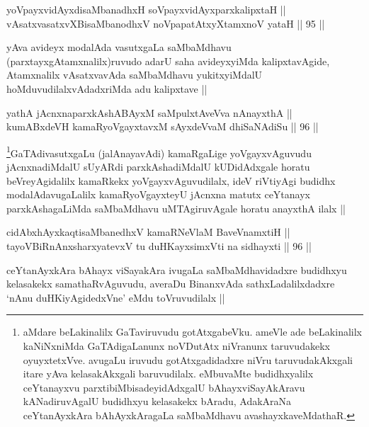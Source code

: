 \begin{shl}
yoV\s payxvidAyxdisaMbanadhxH soV\s payxvidAyxparxkalipxtaH ||  \\
vAsatxvasatxvXBisaMbanodhxV noVpapatAtxyX\s \s tamxnoV yataH ||  95 ||  
\end{shl}

\begin{artha}
yAva avideyx modalAda vasutxgaLa saMbaMdhavu (parxtayxgAtamxnalilx)ruvudo adarU saha avideyxyiMda kalipxtavAgide, Atamxnalilx vAsatxvavAda saMbaMdhavu yukitxyiMdalU hoMduvudilalxvAdadxriMda adu kalipxtave ||
\end{artha}


\begin{shl}
yathA jAcnxnaparxkAshABAyxM saMpulxtAveVva nAnayxthA || \\
kumABxdeVH kamaRyoVgayxtavxM sAyxdeVvaM dhiSaNAdiSu ||  96 || 
\end{shl}

\begin{artha}
\footnote{aMdare beLakinalilx GaTaviruvudu gotAtxgabeVku. ameVle ade beLakinalilx kaNiNxniMda GaTAdigaLanunx noVDutAtx niVranunx taruvudakekx oyuyxtetxVve. avugaLu iruvudu gotAtxgadidadxre niVru taruvudakAkxgali itare yAva kelasakAkxgali baruvudilalx. eMbuvaMte budidhxyalilx ceYtanayxvu parxtibiMbisadeyidAdxgalU bAhayxviSayAkAravu kANadiruvAgalU budidhxyu kelasakekx bAradu, AdakAraNa ceYtanAyxkAra bAhAyxkAragaLa saMbaMdhavu avashayxkaveMdathaR.}GaTAdivasutxgaLu (jalAnayavAdi) kamaRgaLige yoVgayxvAguvudu jAcnxnadiMdalU sUyARdi parxkAshadiMdalU kUDidAdxgale horatu beVreyAgidalilx kamaRkekx yoVgayxvAguvudilalx, ideV riVtiyAgi budidhx modalAdavugaLalilx kamaRyoVgayxteyU jAcnxna matutx ceYtanayx parxkAshagaLiMda saMbaMdhavu uMTAgiruvAgale horatu anayxthA ilalx ||
\end{artha}


\begin{shl}
cidAbxhAyxkaqtisaMbanedhxV kamaRNeV\s laM BaveVnamxtiH || \\
tayoVBiRnAnxsharxyatevxV tu duHKayxsimxVti na sidhayxti ||  96 ||  
\end{shl}

\begin{artha}
ceYtanAyxkAra bAhayx viSayakAra ivugaLa saMbaMdhavidadxre budidhxyu kelasakekx samathaRvAguvudu, averaDu BinanxvAda sathxLadalilxdadxre `nAnu duHKiyAgidedxVne' eMdu toVruvudilalx ||
\end{artha}


